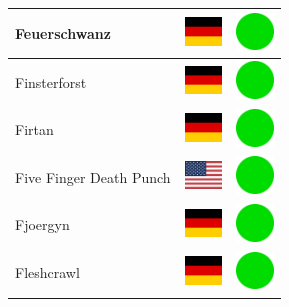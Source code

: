 \documentclass[12pt, a4paper, twoside]{report}
\begin{document}
\begin{center}
\begin{longtable}{|p{5cm}|p{2cm}|p{2cm}|}
Feuerschwanz & \includegraphics[width=1cm]{4x3/de} & \includegraphics[width=1cm]{likes/y} \\ \hline
Finsterforst & \includegraphics[width=1cm]{4x3/de} & \includegraphics[width=1cm]{likes/y} \\ \hline
Firtan & \includegraphics[width=1cm]{4x3/de} & \includegraphics[width=1cm]{likes/y} \\ \hline
Five Finger Death Punch & \includegraphics[width=1cm]{4x3/us} & \includegraphics[width=1cm]{likes/y} \\ \hline
Fjoergyn & \includegraphics[width=1cm]{4x3/de} & \includegraphics[width=1cm]{likes/y} \\ \hline
Fleshcrawl & \includegraphics[width=1cm]{4x3/de} & \includegraphics[width=1cm]{likes/y} \\ \hline

\end{longtable}
\end{center}
\end{document}
